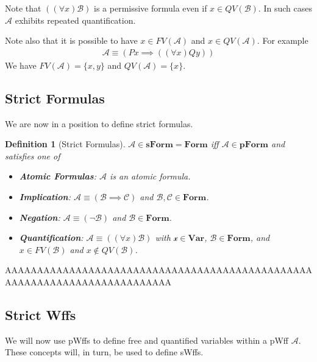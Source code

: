 \documentclass[12pt]{article}
\theoremstyle{break}
\newtheorem{definition}{Definition}[section]
\theoremstyle{break}
\theoremstyle{break}
\theoremstyle{break}
\newcommand{\mc}[1]{\mathcal{#1}}
\begin{document}
Note that $((\forall x)\mc{B})$ is a permissive formula even if $x\in QV(\mc{B})$.
In such cases $\mc{A}$ exhibits repeated quantification.

Note also that it is possible to have $x\in FV(\mc{A})$ and $x\in QV(\mc{A})$.
For example
\begin{align}
\mc{A} \equiv (Px \implies ((\forall x) Qy))
\end{align}
We have $FV(\mc{A}) = \{x, y\}$ and $QV(\mc{A}) = \{x\}$.

\subsection{Strict Formulas}

We are now in a position to define strict formulas.
\begin{definition}[Strict Formulas]
$\mc{A}\in\textbf{sForm} = \textbf{Form}$ iff $\mc{A} \in \textbf{pForm}$ and satisfies one of
\begin{itemize}
\item{\textbf{Atomic Formulas}: $\mc{A}$ is an atomic formula.}
\item{\textbf{Implication}: $\mc{A} \equiv (\mc{B} \implies \mc{C})$ and $\mc{B}, \mc{C} \in \textbf{Form}$.}
\item{\textbf{Negation}: $\mc{A} \equiv (\lnot \mc{B})$ and $\mc{B}\in\textbf{Form}$.}
\item{\textbf{Quantification}: $\mc{A} \equiv ((\forall x)\mc{B})$ with $\mc{x}\in\textbf{Var}$, $\mc{B}\in\textbf{Form}$, and $x\in FV(\mc{B})$ and $x\not\in QV(\mc{B})$.}
\end{itemize}
\end{definition}



AAAAAAAAAAAAAAAAAAAAAAAAAAAAAAAAAAAAAAAAAAAAAAAAAAAAAAAAAAAAAAAAAAAAAAAAAA

\subsection{Strict Wffs}
We will now use pWffs to define free and quantified variables within a pWff $\mc{A}$.
These concepts will, in turn, be used to define sWffs.
\end{document}
